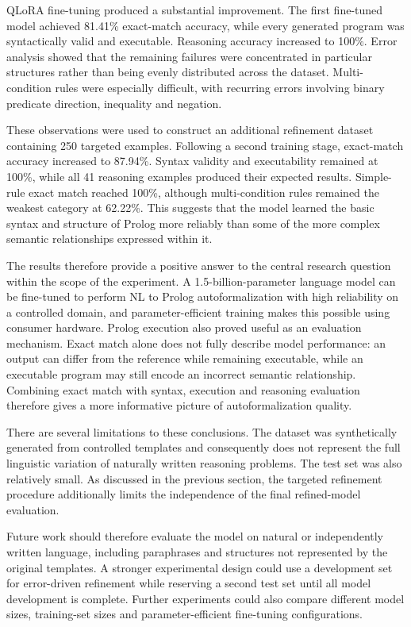 \documentclass[11pt]{article} %
\theoremstyle{plain}
\theoremstyle{definition}
\begin{document}
QLoRA fine-tuning produced a substantial improvement. The first fine-tuned
model achieved 81.41\% exact-match accuracy, while every generated program was
syntactically valid and executable. Reasoning accuracy increased to 100\%.
Error analysis showed that the remaining failures were concentrated in
particular structures rather than being evenly distributed across the dataset.
Multi-condition rules were especially difficult, with recurring errors
involving binary predicate direction, inequality and negation.

These observations were used to construct an additional refinement dataset
containing 250 targeted examples. Following a second training stage,
exact-match accuracy increased to 87.94\%. Syntax validity and executability
remained at 100\%, while all 41 reasoning examples produced their expected
results. Simple-rule exact match reached 100\%, although multi-condition rules
remained the weakest category at 62.22\%. This suggests that the model learned
the basic syntax and structure of Prolog more reliably than some of the more
complex semantic relationships expressed within it.

The results therefore provide a positive answer to the central research
question within the scope of the experiment. A 1.5-billion-parameter language
model can be fine-tuned to perform NL to Prolog autoformalization with high
reliability on a controlled domain, and parameter-efficient training makes
this possible using consumer hardware. Prolog execution also proved useful
as an evaluation mechanism. Exact match alone does not fully describe model
performance: an output can differ from the reference while remaining
executable, while an executable program may still encode an incorrect semantic
relationship. Combining exact match with syntax, execution and reasoning
evaluation therefore gives a more informative picture of autoformalization
quality.

There are several limitations to these conclusions. The dataset was synthetically
generated from controlled templates and consequently does not represent the
full linguistic variation of naturally written reasoning problems. The test set was
also relatively small. As discussed in the previous section, the targeted
refinement procedure additionally limits the independence of the final
refined-model evaluation.


Future work should therefore evaluate the model on natural or independently
written language, including paraphrases and structures not represented by the
original templates. A stronger experimental design could use a development set
for error-driven refinement while reserving a second test set until all model
development is complete. Further experiments could also compare different
model sizes, training-set sizes and parameter-efficient fine-tuning
configurations.
\end{document}
